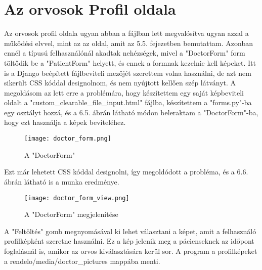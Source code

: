 \section{Az orvosok Profil oldala}

Az orvosok profil oldala ugyan abban a fájlban lett megvalósítva ugyan azzal a működési elvvel, mint az az oldal, amit az 5.5. fejezetben bemutattam. Azonban ennél a típusú felhasználónál akadtak nehézségek, mivel a "DoctorForm" form töltődik be a "PatientForm" helyett, és ennek a formnak kezelnie kell képeket. Itt is a Django beépített fájlbeviteli mezőjét szerettem volna használni, de azt nem sikerült CSS kóddal designolnom, és nem nyújtott kellően szép látványt. A megoldásom az lett erre a problémára, hogy készítettem egy saját képbeviteli oldalt a "custom\_clearable\_file\_input.html" fájlba, készítettem a "forms.py"-ba egy osztályt hozzá, és a 6.5. ábrán látható módon beleraktam a "DoctorForm"-ba, hogy ezt használja a képek beviteléhez.

\begin{figure}[!htbp]
	\caption{A "DoctorForm"}
	\label{fig:doctorform}
	\centering
	\texttt{[image: doctor\_form.png]}
\end{figure}

Ezt már lehetett CSS kóddal designolni, így megoldódott a probléma, és a 6.6. ábrán látható is a munka eredménye.

\begin{figure}[!htbp]
	\caption{A "DoctorForm" megjelenítése}
	\label{fig:doctorformview}
	\centering
	\texttt{[image: doctor\_form\_view.png]}
\end{figure}

A "Feltöltés" gomb megnyomásával ki lehet választani a képet, amit a felhasználó profilképként szeretne használni. Ez a kép jelenik meg a pácienseknek az időpont foglalásnál is, amikor az orvos kiválasztására kerül sor. A program a profilképeket a rendelo/media/doctor\_pictures mappába menti.




